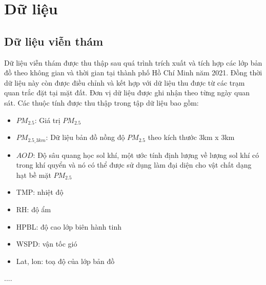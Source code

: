 \chapter{Dữ liệu}
\section{Dữ liệu viễn thám}
Dữ liệu viễn thám được thu thập sau quá trình trích xuất và tích hợp các lớp bản đồ theo không gian và thời gian tại thành phố Hồ Chí Minh năm 2021. Đồng thời dữ liệu này còn được điều chỉnh và kết hợp với dữ liệu thu được từ các trạm quan trắc đặt tại mặt đất. Đơn vị dữ liệu được ghi nhận theo từng ngày quan sát. Các thuộc tính được thu thập trong tập dữ liệu bao gồm:
\begin{itemize}
    \item $PM_{2.5}$: Giá trị $PM_{2.5}$
    \item $PM_{2.5\_3km}$: Dữ liệu bản đồ nồng độ $PM_{2.5}$ theo kích thước 3km x 3km
    \item $AOD$: Độ sâu quang học sol khí, một ước tính định lượng về lượng sol khí có trong khí quyển và nó có thể được sử dụng làm đại diện cho vật chất dạng hạt bề mặt $PM_{2.5}$
    \item TMP: nhiệt độ
    \item RH: độ ẩm
    \item HPBL: độ cao lớp biên hành tinh
    \item WSPD: vận tốc gió
    \item Lat, lon: toạ độ của lớp bản đồ
\end{itemize}
....
